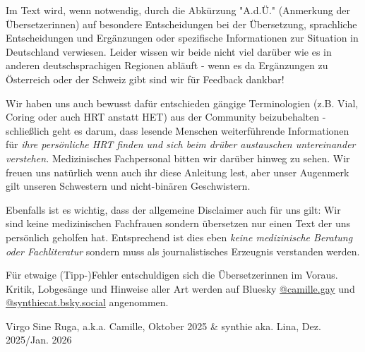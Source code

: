 \documentclass{article}
\begin{document}
Im Text wird, wenn notwendig, durch die Abkürzung "A.d.Ü." (Anmerkung der Übersetzerinnen) auf besondere Entscheidungen bei der Übersetzung, sprachliche Entscheidungen und Ergänzungen oder spezifische Informationen zur Situation in Deutschland verwiesen. Leider wissen wir beide nicht viel darüber wie es in anderen deutschsprachigen Regionen abläuft - wenn es da Ergänzungen zu Österreich oder der Schweiz gibt sind wir für Feedback dankbar!

Wir haben uns auch bewusst dafür entschieden gängige Terminologien (z.B. Vial, Coring oder auch HRT anstatt HET) aus der Community beizubehalten - schließlich geht es darum, dass lesende Menschen weiterführende Informationen für \textit{ihre persönliche HRT finden und sich beim drüber austauschen untereinander verstehen.} Medizinisches Fachpersonal bitten wir darüber hinweg zu sehen. Wir freuen uns natürlich wenn auch ihr diese Anleitung lest, aber unser Augenmerk gilt unseren Schwestern und nicht-binären Geschwistern.

Ebenfalls ist es wichtig, dass der allgemeine Disclaimer auch für uns gilt: Wir sind keine medizinischen Fachfrauen sondern übersetzen nur einen Text der uns persönlich geholfen hat. Entsprechend ist dies eben \textit{keine medizinische Beratung oder Fachliteratur} sondern muss als journalistisches Erzeugnis verstanden werden.

Für etwaige (Tipp-)Fehler entschuldigen sich die Übersetzerinnen im Voraus. Kritik, Lobgesänge und Hinweise aller Art werden auf Bluesky \href{https://bsky.app/profile/camille.gay}{@camille.gay} und \href{https://bsky.app/profile/synthiecat.bsky.social}{@synthiecat.bsky.social} angenommen.

Virgo Sine Ruga, a.k.a. Camille, Oktober 2025 \& synthie aka. Lina, Dez. 2025/Jan. 2026
\end{document}
